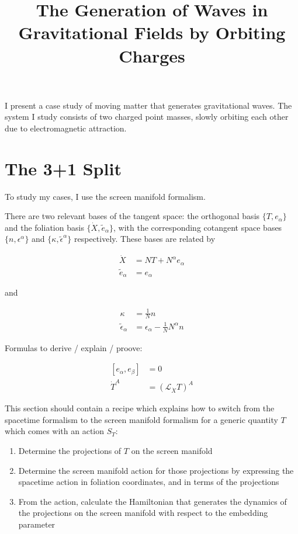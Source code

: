 \documentclass[11pt]{article}
\begin{document}
\title{The Generation of Waves in Gravitational Fields by Orbiting Charges}

I present a case study of moving matter that generates gravitational  waves. The system I study consists of two charged point masses, slowly orbiting each other due to electromagnetic attraction.

\section{The 3+1 Split}

To study my cases, I use the screen manifold formalism.

There are two relevant bases of the tangent space: the orthogonal basis $\{T, e_\alpha\}$ and the foliation basis $\{\dot{X} , \tilde{e}_\alpha\}$, with the corresponding cotangent space bases $\{ n, \epsilon^\alpha\}$ and $\{\kappa, \tilde{\epsilon}^\alpha \}$ respectively. These bases are related by

\begin{align}	
	\dot{X} &= N T + N^\alpha e_\alpha\\
	\tilde{e}_\alpha &= e_\alpha
\end{align}

and

\begin{align}	
	\kappa &= \frac{1}{N} n \\
	\tilde{\epsilon}_\alpha &= \epsilon_\alpha - \frac{1}{N} N^\alpha n
\end{align}

Formulas to derive / explain / proove:

\begin{align}
	\left[ e_{\alpha}, e_{\beta}\right] &= 0 \\
	\dot{T}^{A} &= \left( \mathcal{L}_{\dot{X}} T \right)^A
\end{align}

This section should contain a recipe which explains how to switch from the spacetime formalism to the screen manifold formalism for a generic quantity $T$ which comes with an action $S_T$:
\begin{enumerate}
	\item Determine the projections of $T$ on the screen manifold
	\item Determine the screen manifold action for those projections by expressing the spacetime action in foliation coordinates, and in terms of the projections
	\item From the action, calculate the Hamiltonian that generates the dynamics of the projections on the screen manifold with respect to the embedding parameter
\end{enumerate}
\end{document}
